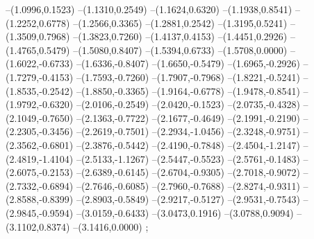 {--(1.0996,0.1523)
--(1.1310,0.2549)
--(1.1624,0.6320)
--(1.1938,0.8541)
--(1.2252,0.6778)
--(1.2566,0.3365)
--(1.2881,0.2542)
--(1.3195,0.5241)
--(1.3509,0.7968)
--(1.3823,0.7260)
--(1.4137,0.4153)
--(1.4451,0.2926)
--(1.4765,0.5479)
--(1.5080,0.8407)
--(1.5394,0.6733)
--(1.5708,0.0000)
--(1.6022,-0.6733)
--(1.6336,-0.8407)
--(1.6650,-0.5479)
--(1.6965,-0.2926)
--(1.7279,-0.4153)
--(1.7593,-0.7260)
--(1.7907,-0.7968)
--(1.8221,-0.5241)
--(1.8535,-0.2542)
--(1.8850,-0.3365)
--(1.9164,-0.6778)
--(1.9478,-0.8541)
--(1.9792,-0.6320)
--(2.0106,-0.2549)
--(2.0420,-0.1523)
--(2.0735,-0.4328)
--(2.1049,-0.7650)
--(2.1363,-0.7722)
--(2.1677,-0.4649)
--(2.1991,-0.2190)
--(2.2305,-0.3456)
--(2.2619,-0.7501)
--(2.2934,-1.0456)
--(2.3248,-0.9751)
--(2.3562,-0.6801)
--(2.3876,-0.5442)
--(2.4190,-0.7848)
--(2.4504,-1.2147)
--(2.4819,-1.4104)
--(2.5133,-1.1267)
--(2.5447,-0.5523)
--(2.5761,-0.1483)
--(2.6075,-0.2153)
--(2.6389,-0.6145)
--(2.6704,-0.9305)
--(2.7018,-0.9072)
--(2.7332,-0.6894)
--(2.7646,-0.6085)
--(2.7960,-0.7688)
--(2.8274,-0.9311)
--(2.8588,-0.8399)
--(2.8903,-0.5849)
--(2.9217,-0.5127)
--(2.9531,-0.7543)
--(2.9845,-0.9594)
--(3.0159,-0.6433)
--(3.0473,0.1916)
--(3.0788,0.9094)
--(3.1102,0.8374)
--(3.1416,0.0000)
;}
